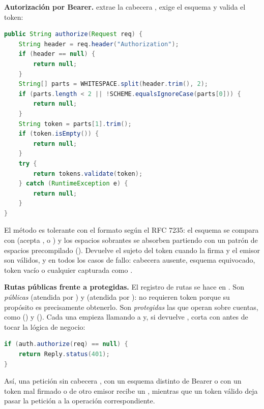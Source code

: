 \textbf{Autorización por Bearer.}  extrae la cabecera
, exige el esquema  y valida el token:

\begin{lstlisting}[language=Java,caption={Authenticator.authorize: validacion del Bearer}]
public String authorize(Request req) {
    String header = req.header("Authorization");
    if (header == null) {
        return null;
    }
    String[] parts = WHITESPACE.split(header.trim(), 2);
    if (parts.length < 2 || !SCHEME.equalsIgnoreCase(parts[0])) {
        return null;
    }
    String token = parts[1].trim();
    if (token.isEmpty()) {
        return null;
    }
    try {
        return tokens.validate(token);
    } catch (RuntimeException e) {
        return null;
    }
}
\end{lstlisting}

El método es tolerante con el formato según el RFC 7235: el esquema se compara con
 (acepta ,  o
) y los espacios sobrantes se absorben partiendo con un patrón de
espacios precompilado (). Devuelve el sujeto del token cuando
la firma y el emisor son válidos, y  en todos los casos de fallo:
cabecera ausente, esquema equivocado, token vacío o cualquier
 capturada como .

\textbf{Rutas públicas frente a protegidas.} El registro de rutas se hace en
. Son \emph{públicas}  (atendida
por ) y  (atendida por
): no requieren token porque su propósito es precisamente
obtenerlo. Son \emph{protegidas} las que operan sobre cuentas, como
 () y
 (). Cada una
empieza llamando a  y, si devuelve ,
corta con  antes de tocar la lógica de negocio:

\begin{lstlisting}[language=Java,caption={BalanceEndpoint: corte 401 si el token falla}]
if (auth.authorize(req) == null) {
    return Reply.status(401);
}
\end{lstlisting}

Así, una petición sin cabecera , con un esquema distinto de
Bearer o con un token mal firmado o de otro emisor recibe un , mientras que un token válido deja pasar la petición a la operación
correspondiente.
